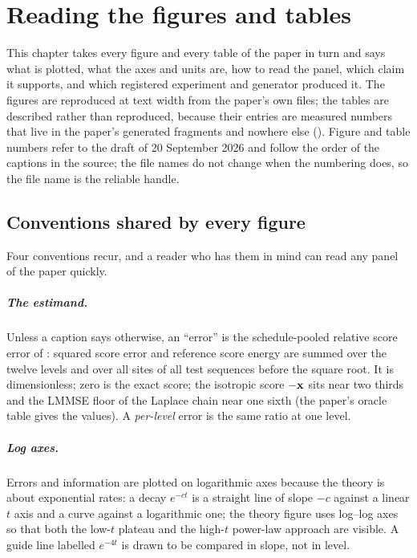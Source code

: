 \chapter{Reading the figures and tables}
\label{ch:reading-the-figures}
\begingroup\sloppy

This chapter takes every figure and every table of the paper in turn and says what is
plotted, what the axes and units are, how to read the panel, which claim it supports,
and which registered experiment and generator produced it. The figures are reproduced
at text width from the paper's own files; the tables are described rather than
reproduced, because their entries are measured numbers that live in the paper's
generated fragments and nowhere else (). Figure and table numbers
refer to the draft of 20 September 2026 and follow the order of the captions in the
source; the file names do not change when the numbering does, so the file name is the
reliable handle.

\section{Conventions shared by every figure}
\label{sec:fig-conventions}

Four conventions recur, and a reader who has them in mind can read any panel of the
paper quickly.

\paragraph{The estimand.} Unless a caption says otherwise, an ``error'' is the
schedule-pooled relative score error of : squared score
error and reference score energy are summed over the twelve levels and over all sites of
all test sequences before the square root. It is dimensionless; zero is the exact
score; the isotropic score $-\mathbf{x}$ sits near two thirds and the LMMSE floor of the
Laplace chain near one sixth (the paper's oracle table gives the values). A
\emph{per-level} error is the same ratio at one level.

\paragraph{Log axes.} Errors and information are plotted on logarithmic axes because
the theory is about exponential rates: a decay $e^{-ct}$ is a straight line of slope
$-c$ against a linear $t$ axis and a curve against a logarithmic one; the theory figure
uses log--log axes so that both the low-$t$ plateau and the high-$t$ power-law approach
are visible. A guide line labelled $e^{-4t}$ is drawn to be compared in slope, not in
level.

